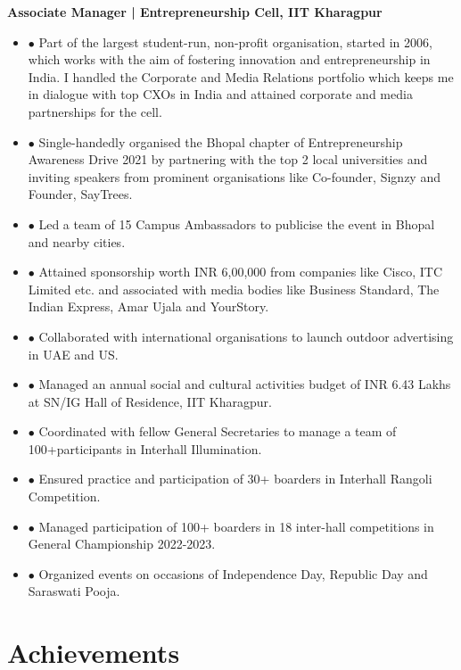 \documentclass[a4paper,11pt]{article}
\newcommand{\resumeItemListStart}{\begin{justify}\begin{itemize}[leftmargin=3ex, rightmargin=2ex, noitemsep,labelsep=1.2mm,itemsep=0mm]\small}
\newcommand{\resumeItemListEnd}{\end{itemize}\end{justify}\vspace{-1.5mm}}
\begin{document}
\textbf{Associate Manager | Entrepreneurship Cell, IIT Kharagpur}\hspace {65mm}{May 2021 - April 2022}
\resumeItemListStart
\item[$\bullet$]Part of the largest student-run, non-profit organisation, started in 2006, which works with the aim of fostering
innovation and entrepreneurship in India. I handled the Corporate and Media Relations portfolio which keeps me in
dialogue with top CXOs in India and attained corporate and media partnerships for the cell.
\item[$\bullet$] Single-handedly organised the Bhopal chapter of Entrepreneurship Awareness Drive 2021 by partnering with the
top 2 local universities and inviting speakers from prominent organisations like Co-founder, Signzy and Founder,
SayTrees.
\item[$\bullet$] Led a team of 15 Campus Ambassadors to publicise the event in Bhopal and nearby cities.
\item[$\bullet$] Attained sponsorship worth INR 6,00,000 from companies like Cisco, ITC Limited etc. and associated with media
bodies like Business Standard, The Indian Express, Amar Ujala and YourStory.
\item[$\bullet$] Collaborated with international organisations to launch outdoor advertising in UAE and US.
\resumeItemListEnd

\hspace{55mm}{May 2022 - Present}
\resumeItemListStart
\item[$\bullet$] Managed an annual social and cultural activities budget of INR 6.43 Lakhs at SN/IG Hall of Residence, IIT Kharagpur.
\item[$\bullet$] Coordinated with fellow General Secretaries to manage a team of 100+participants in Interhall Illumination.
\item[$\bullet$] Ensured practice and participation of 30+ boarders in Interhall Rangoli Competition.
\item[$\bullet$] Managed participation of 100+ boarders in 18 inter-hall competitions in General Championship 2022-2023.
\item[$\bullet$] Organized events on occasions of Independence Day, Republic Day and Saraswati Pooja.
\resumeItemListEnd


\vspace{-2.5mm}

\section{Achievements}
\vspace{0.2mm}
\end{document}
